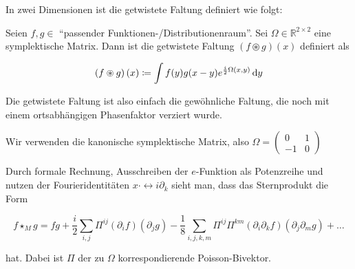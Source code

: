 In zwei Dimensionen ist die getwistete Faltung definiert wie folgt:

\begin{definition}
\label{def:twisted_convolution}
    Seien $f,g \in $ "`passender Funktionen-/Distributionenraum"'. Sei $\Omega \in \mathbb{R}^{2 \times 2}$ eine symplektische Matrix. Dann ist die getwistete Faltung $(f \circledast g) (x)$ definiert als

    \begin{equation}
        (f \circledast g) \,(x) \coloneqq
        \int f(y) g(x-y)e^{\frac{i}{2} \Omega(x,y)} \mathop{}\!\mathrm{d} y
    \end{equation}

    Die getwistete Faltung ist also einfach die gewöhnliche Faltung, die noch mit einem ortsabhängigen Phasenfaktor verziert wurde.

    Wir verwenden die kanonische symplektische Matrix, also
    $\Omega = \left(\begin{smallmatrix}
        0 & 1 \\ -1 & 0
    \end{smallmatrix}\right)$
\end{definition}

Durch formale Rechnung, Ausschreiben der $e$-Funktion als Potenzreihe und nutzen der Fourieridentitäten $x \cdot \leftrightarrow i \partial_k$ sieht man, dass das Sternprodukt die Form

\begin{equation*}
    f \star_M g = fg + \frac{i}{2} \sum_{i,j} \Pi^{ij}(\partial_if)(\partial_jg) - \frac{1}{8}\sum_{i,j,k,m} \Pi^{ij} \Pi^{km} (\partial_i \partial_k f)(\partial_j \partial_m g) + \dots
\end{equation*}

hat. Dabei ist $\Pi$ der zu $\Omega$ korrespondierende Poisson-Bivektor.


